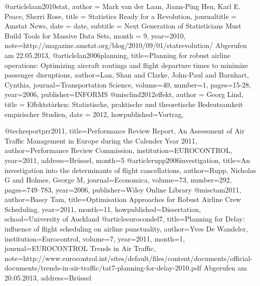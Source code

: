 @article{laan2010stat,
author = {Mark van der Laan, Jiann-Ping Hsu, Karl E. Peace, Sherri Rose},
title = {Statistics Ready for a Revolution},
journaltitle = {Amstat News},
date = {date},
subtitle = {Next Generation of Statisticians Must Build Tools for Massive Data Sets},
month = {9},
year={2010},
note={http://magazine.amstat.org/blog/2010/09/01/statrevolution/ Abgerufen am 22.05.2013},
}
@article{lan2006planning,
  title={Planning for robust airline operations: Optimizing aircraft routings and flight departure times to minimize passenger disruptions},
  author={Lan, Shan and Clarke, John-Paul and Barnhart, Cynthia},
  journal={Transportation Science},
  volume={40},
  number={1},
  pages={15-28},
  year={2006},
  publisher={INFORMS}
}
@misc{lind2012effekt,
author = {Georg Lind},
title = {Effektstärken: Statistische, praktische und theoretische Bedeutsamkeit empirischer Studien},
date = {2012},
howpublished={Vortrag},
}

@techreport{prr2011,
	title={Performance Review Report, An Assessment of Air Traffic Management in Europe during the Calender Year 2011},
	author={Performance Review Commission},
	institution={EUROCONTROL},
	year={2011},
	address={Brüssel},
	month={5}
}
@article{rupp2006investigation,
  title={An investigation into the determinants of flight cancellations},
  author={Rupp, Nicholas G and Holmes, George M},
  journal={Economica},
  volume={73},
  number={292},
  pages={749--783},
  year={2006},
  publisher={Wiley Online Library}
}
@misc{tam2011,
	author={Bassy Tam},
	title={Optimisation Approaches for Robust Airline Crew Scheduling},
	year={2011},
	month={11},
	howpublished={Dissertation},
	school={University of Auckland}
}
@article{eurocondel7,
	title={Planning for Delay: influence of flight scheduling on airline punctuality},
	author={Yves De Wandeler},
	institution={Eurocontrol},
	volume={7},
	year={2011},
	month={1},
	journal={EUROCONTROL Trends in Air Traffic},
	note={http://www.eurocontrol.int/sites/default/files/content/documents/official-documents/trends-in-air-traffic/tat7-planning-for-delay-2010.pdf
	Abgerufen am 20.05.2013},
	address={Brüssel}
}







